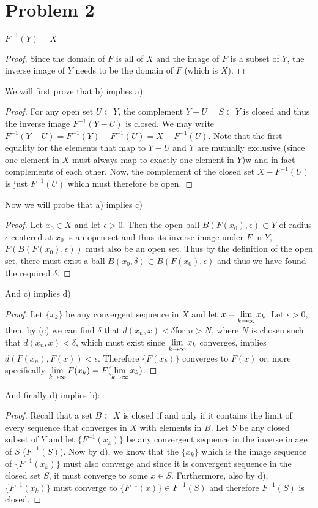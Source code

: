\section*{Problem 2}
\begin{lemma} $F^{-1}(Y) = X$
\begin{proof}
Since the domain of $F$ is all of $X$ and the image of $F$ is a subset of $Y$, the inverse image of $Y$ needs to be the domain of $F$ (which is $X$).
\end{proof}
\end{lemma}
We will first prove that b) implies a):
\begin{proof}
For any open set $U\subset Y$, the complement $Y-U=S\subset Y$ is closed and thus the inverse image $F^{-1}(Y-U)$ is closed. We may write $F^{-1}(Y-U) = F^{-1}(Y)-F^{-1}(U)=X-F^{-1}(U)$. Note that the first equality for the elements that map to $Y-U$ and $Y$ are mutually exclusive (since one element in $X$ must always map to exactly one element in $Y$)w and in fact complements of each other. Now, the complement of the closed set $X-F^{-1}(U)$ is just $F^{-1}(U)$ which must therefore be open.
\end{proof}
Now we will probe that a) implies c)
\begin{proof}
Let $x_0\in X$ and let $\epsilon>0$. Then the open ball $B(F(x_0),\epsilon)\subset Y$ of radius $\epsilon$ centered at $x_0$ is an open set and thus its inverse image under $F$ in $Y$,  $F(B(F(x_0),\epsilon))$ must also be an open set. Thus by the definition of the open set, there must exist a ball $B(x_0,\delta) \subset B(F(x_0),\epsilon)$ and thus we have found the required $\delta$.
\end{proof}
And c) implies d)
\begin{proof}
Let $\{x_k\}$ be any convergent sequence in $X$ and let $x=\lim\limits_{k\to\infty} x_k$. Let $\epsilon>0$, then, by (c) we can find $\delta$ that $d(x_n,x)<\delta$for $n>N$, where $N$ is chosen such that $d(x_n,x)<\delta$, which must exist since $\lim\limits_{k\to\infty} x_k$ converges,  implies $d(F(x_n),F(x)) < \epsilon$. Therefore $\{
F(x_k)\}$ converges to $F(x)$ or, more specifically $\lim\limits_{k\to\infty} F(x_k) = F(\lim\limits_{k\to\infty} x_k)$. 
\end{proof} 
And finally d) implies b):
\begin{proof}
Recall that a set $B \subset X$ is closed if and only if it contains the limit of every sequence that converges in $X$ with elements in $B$. 
Let $S$ be any closed subset of $Y$ and let $\{F^{-1}(x_k)\}$ be any convergent sequence in the inverse image of $S$ ($F^{-1}(S)$). Now by d), we know that the $\{x_k\}$ which is the image sequence of $\{F^{-1}(x_k)\}$ must also converge and since it is convergent sequence in the closed set $S$, it must converge to some $x\in S$. Furthermore, also by d), $\{F^{-1}(x_k)\}$ must converge to $\{F^{-1}(x)\}\in F^{-1}(S)$ and therefore $F^{-1}(S)$ is closed.
\end{proof}
